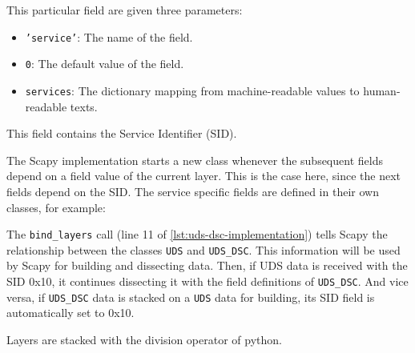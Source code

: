 This particular field are given three parameters:

\begin{itemize}
    \item \texttt{'service'}: The name of the field.
    \item \texttt{0}: The default value of the field.
    \item \texttt{services}: The dictionary mapping from machine-readable values to human-readable texts.
\end{itemize}

This field contains the Service Identifier (SID).

The Scapy implementation starts a new class whenever the subsequent fields depend on a field value of the current layer. This is the case here, since the next fields depend on the SID. The service specific fields are defined in their own classes, for example:


The \texttt{bind_layers} call (line 11 of \autoref{lst:uds-dsc-implementation}) tells Scapy the relationship between the classes \texttt{UDS} and \texttt{UDS_DSC}. This information will be used by Scapy for building and dissecting data.
Then, if UDS data is received with the SID 0x10, it continues dissecting it with the field definitions of \texttt{UDS_DSC}. And vice versa, if \texttt{UDS_DSC} data is stacked on a \texttt{UDS} data for building, its SID field is automatically set to 0x10.

Layers are stacked with the division operator of python.


